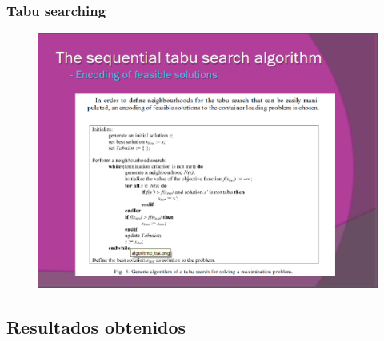 \documentclass{beamer}
\begin{document}
\begin{frame}
\frametitle{Tabu searching }
\begin{figure}[!th]
\begin{center}
\includegraphics[width=1\textwidth]{img/picn10.eps}
\end{center}
\end{figure}
\end{frame}

\subsection{Resultados obtenidos}
\end{document}

